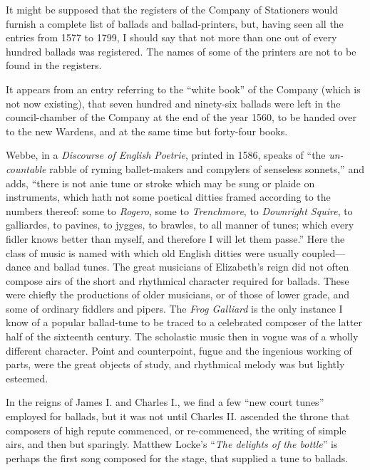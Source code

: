 It might be supposed that the registers of the Company of Stationers would 
furnish a complete list of ballads and ballad-printers, but, having seen all the
entries from 1577 to 1799, I should say that not more than one out of every
hundred ballads was registered. The names of some of the printers are not to
be found in the registers.

It appears from an entry referring to the “white book” of the Company
(which is not now existing), that seven hundred and ninety-six ballads were left
in the council-chamber of the Company at the end of the year 1560, to be handed
over to the new Wardens, and at the same time but forty-four books.

Webbe, in a \textit{Discourse of English Poetrie}, printed in 1586, speaks of “the
\textit{un-countable} rabble of ryming ballet-makers and compylers of senseless sonnets,”
and adds, “there is not anie tune or stroke which may be sung or plaide on
instruments, which hath not some poetical ditties framed according to the numbers
thereof: some to \textit{Rogero}, some to \textit{Trenchmore}, to \textit{Downright Squire}, to galliardes,
to pavines, to jygges, to brawles, to all manner of tunes; which every fidler knows
better than myself, and therefore I will let them passe.” Here the class of music
is named with which old English ditties were usually coupled—dance and ballad
tunes. The great musicians of Elizabeth’s reign did not often compose airs of
the short and rhythmical character required for ballads. These were chiefly the
productions of older musicians, or of those of lower grade, and some of ordinary
fiddlers and pipers. The \textit{Frog Galliard} is the only instance I know of a popular
ballad-tune to be traced to a celebrated composer of the latter half of the sixteenth
century. The scholastic music then in vogue was of a wholly different character.
Point and counterpoint, fugue and the ingenious working of parts, were the great
objects of study, and rhythmical melody was but lightly esteemed.

In the reigns of James I. and Charles I., we find a few “new court tunes”
employed for ballads, but it was not until Charles II. ascended the throne that
composers of high repute commenced, or re-commenced, the writing of simple
airs, and then but sparingly. Matthew Locke’s “\textit{The delights of the bottle}” is
perhaps the first song composed for the stage, that supplied a tune to ballads.


